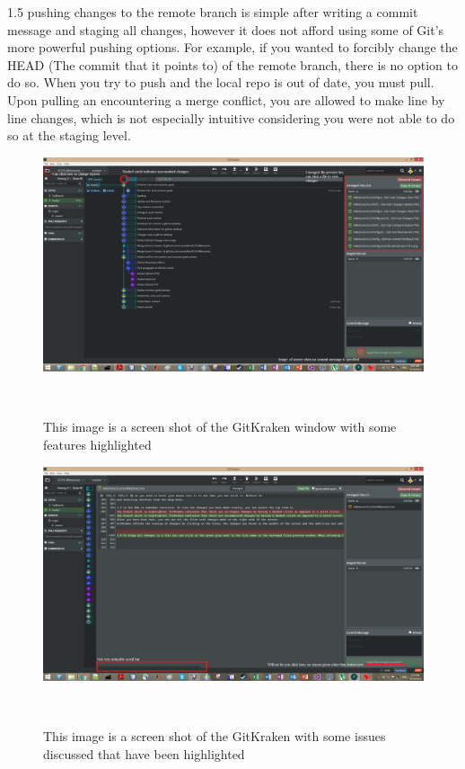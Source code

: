\documentclass{sigchi}
\begin{document}
1.5 pushing changes to the remote branch is simple after writing a commit message and staging all changes, however it does not afford using some of Git's more powerful pushing options. For example, if you wanted to forcibly change the HEAD (The commit that it points to) of the remote branch, there is no option to do so. When you try to push and the local repo is out of date, you must pull. Upon pulling an encountering a merge conflict, you are allowed to make line by line changes, which is not especially intuitive considering you were not able to do so at the staging level.

\begin{figure}
  \centering
  \includegraphics[width=1.75\columnwidth]{figures/GitKraken/ScreenshotHighlighted}
  \caption{This image is a screen shot of the GitKraken window with some features highlighted}~\label{fig:GitKrakenFigure2}
\end{figure}

\begin{figure}
  \centering
  \includegraphics[width=1.75\columnwidth]{figures/GitKraken/Screenshot2Highlighted}
  \caption{This image is a screen shot of the GitKraken with some issues discussed that have been highlighted}~\label{fig:GitKrakenFigure3}
\end{figure}
\end{document}
